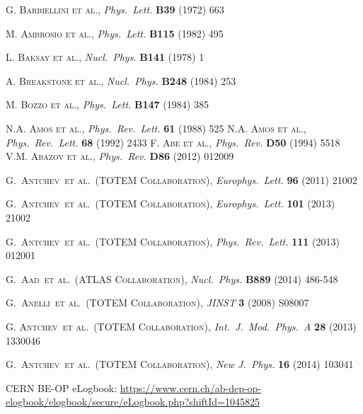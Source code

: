 \documentclass[3p,onecolumn,12pt,times,longtitle]{elsarticle}
\def\etal{et al.}
\def\Name#1{\textsc{#1}, }
\def\REVIEW#1#2#3#4{{\it #1} {\bf #2} (#3) #4}
\begin{document}
\begin{thebibliography}{99}
%
 \Name{G. Barbiellini et al.} \REVIEW{Phys.~Lett.}{B39}{1972}{663}

 \Name{M. Ambrosio et al.} \REVIEW{Phys.~Lett.}{B115}{1982}{495}

 \Name{L. Baksay et al.} \REVIEW{Nucl.~Phys.}{B141}{1978}{1}

 \Name{A. Breakstone et al.} \REVIEW{Nucl.~Phys.}{B248}{1984}{253}

 \Name{M. Bozzo et al.} \REVIEW{Phys.~Lett.}{B147}{1984}{385}

 \Name{N.A. Amos et al.} \REVIEW{Phys.~Rev.~Lett.}{61}{1988}{525}
 \Name{N.A. Amos et al.} \REVIEW{Phys.~Rev.~Lett.}{68}{1992}{2433}
 \Name{F. Abe et al.} \REVIEW{Phys.~Rev.}{D50}{1994}{5518}
 \Name{V.M. Abazov et al.} \REVIEW{Phys.~Rev.}{D86}{2012}{012009}

	\Name{G.~Antchev~\etal{}~(TOTEM Collaboration)}
	\REVIEW{Europhys.~Lett.}{96}{2011}{21002}

	\Name{G.~Antchev~\etal{}~(TOTEM Collaboration)}
	\REVIEW{Europhys.~Lett.}{101}{2013}{21002}

	\Name{G.~Antchev~\etal{}~(TOTEM Collaboration)}
	\REVIEW{Phys.~Rev.~Lett.}{111}{2013}{012001}

	\Name{G.~Aad~\etal{}~(ATLAS Collaboration)}
	\REVIEW{Nucl.~Phys.}{B889}{2014}{486-548}

	\Name{G.~Anelli~\etal{}~(TOTEM Collaboration)}
	\REVIEW{JINST}{3}{2008}{S08007}


	\Name{G. Antchev~\etal{}~(TOTEM Collaboration)}
	\REVIEW{Int.~J.~Mod.~Phys.~A}{28}{2013}{1330046}

	\Name{G.~Antchev~\etal{}~(TOTEM Collaboration)}
	\REVIEW{New J.~Phys.}{16}{2014}{103041}

 CERN BE-OP eLogbook: \url{https://www.cern.ch/ab-dep-op-elogbook/elogbook/secure/eLogbook.php?shiftId=1045825}


\end{thebibliography}
\end{document}

